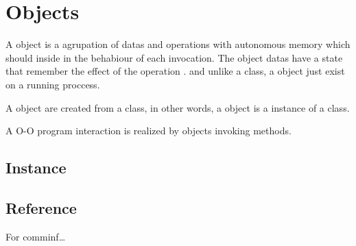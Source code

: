 \section{Objects}

A object is a agrupation 
of datas and operations 
with autonomous memory 
which should inside 
in the behabiour of each invocation. 
The object datas have a state that remember 
the effect of the 
operation \cite{Wegner:1987}.
and unlike a class, a object  
just exist on a running proccess.
 
A object are created from a 
class, in other words, 
a object is a instance of a class.


A O-O program interaction 
is realized by 
objects invoking methods. 

	\subsection{Instance}
	
	
	
	\subsection{Reference}
	
	For comminf\ldots
	
	
	
	
		
	